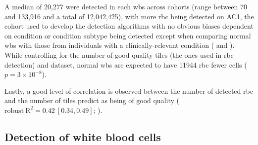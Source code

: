 \begin{figure}[!ht]
    \label{fig:rbc-filter-examples}
\end{figure}

A median of 20,277 were detected in each \ac{wbs} across cohorts (range between 70 and 133,916 and a total of 12,042,425), with more \ac{rbc} being detected on AC1, the cohort used to develop the detection algorithms with no obvious biases dependent on condition or condition subtype being detected except when comparing normal \ac{wbs} with those from individuals with a clinically-relevant condition ( and ). While controlling for the number of good quality tiles (the ones used in \ac{rbc} detection) and dataset, normal \ac{wbs} are expected to have 11944 \ac{rbc} fewer cells ($p=3 \times 10^{-8}$). 

\begin{figure}[!ht]
    \label{fig:rbc-count-coarse}
\end{figure}

\begin{figure}[!ht]
    \label{fig:rbc-count-fine}
\end{figure}

Lastly, a good level of correlation is observed between the number of detected \ac{rbc} and the number of tiles predict as being of good quality ($\mathrm{robust\ R}^2=0.42\ [0.34,0.49]$; ).

\begin{figure}[!ht]
    \label{fig:rbc-quality-tiles}
\end{figure}

\subsection{Detection of white blood cells}

